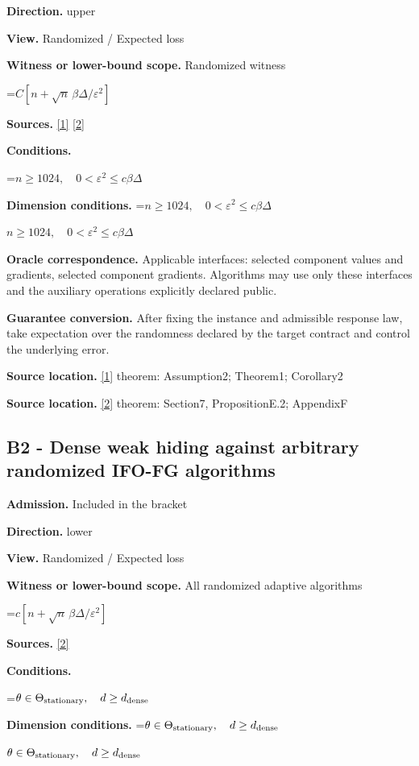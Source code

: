 \documentclass[10pt,a4paper]{article}
\newcommand{\AtlasMath}[1]{\par\begingroup\centering\setbox0=\hbox{$\displaystyle #1$}\ifdim\wd0>1.4\linewidth\typeout{ATLAS WIDE FORMULA: \the\wd0}\fi\ifdim\wd0>\linewidth\resizebox{\linewidth}{!}{\box0}\else\box0\fi\par\endgroup}
\newcommand{\AtlasInlineMath}[1]{\begingroup\setbox0=\hbox{$#1$}\ifdim\wd0>.4\linewidth\endgroup\AtlasMath{#1}\else\endgroup$#1$\fi}
\begin{document}
\textbf{Direction.} upper

\textbf{View.} Randomized / Expected loss

\textbf{Witness or lower-bound scope.} Randomized witness

\AtlasMath{C[n+\sqrt n\,\beta\Delta/\varepsilon^2]}
\textbf{Sources.} \href{https://proceedings.mlr.press/v139/li21a/li21a.pdf}{[1]} \href{https://arxiv.org/pdf/2609.00045v3}{[2]}

\textbf{Conditions.} 
\AtlasMath{n\ge1024,\quad0<\varepsilon^2\le c\beta\Delta}


\textbf{Dimension conditions.} \AtlasInlineMath{n\ge1024,\quad0<\varepsilon^2\le c\beta\Delta}

\textbf{Oracle correspondence.} Applicable interfaces: selected component values and gradients, selected component gradients. Algorithms may use only these interfaces and the auxiliary operations explicitly declared public.

\textbf{Guarantee conversion.} After fixing the instance and admissible response law, take expectation over the randomness declared by the target contract and control the underlying error.

\textbf{Source location.} \href{https://proceedings.mlr.press/v139/li21a/li21a.pdf}{[1]} theorem: Assumption2; Theorem1; Corollary2

\textbf{Source location.} \href{https://arxiv.org/pdf/2609.00045v3}{[2]} theorem: Section7, PropositionE.2; AppendixF

\subsection{B2 - Dense weak hiding against arbitrary randomized IFO-FG algorithms}
\textbf{Admission.} Included in the bracket

\textbf{Direction.} lower

\textbf{View.} Randomized / Expected loss

\textbf{Witness or lower-bound scope.} All randomized adaptive algorithms

\AtlasMath{c[n+\sqrt n\,\beta\Delta/\varepsilon^2]}
\textbf{Sources.} \href{https://arxiv.org/pdf/2609.00045v3}{[2]}

\textbf{Conditions.} 
\AtlasMath{\theta\in\Theta_{\rm stationary},\quad d\ge d_{\rm dense}}


\textbf{Dimension conditions.} \AtlasInlineMath{\theta\in\Theta_{\rm stationary},\quad d\ge d_{\rm dense}}
\end{document}
